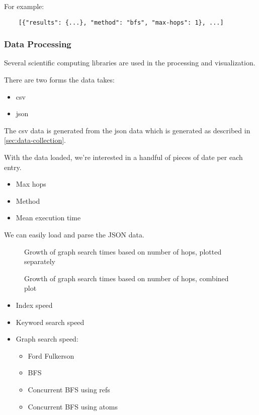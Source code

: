 				For example:
				
				\begin{verbatim}
	[{"results": {...}, "method": "bfs", "max-hops": 1}, ...]
				\end{verbatim}
			
			\subsubsection{Data Processing}
			\label{sec:data-processing}
				Several scientific computing libraries are used in the processing and visualization.
				
				There are two forms the data takes:
				
				\begin{itemize}
					\item \gls{csv}
					\item \gls{json}
				\end{itemize}
				
				The \gls{csv} data is generated from the \gls{json} data which is generated as described in \vref{sec:data-collection}.
				
				With the data loaded, we're interested in a handful of pieces of date per each entry.
				
				\begin{itemize}
					\item Max hops
					\item Method
					\item Mean execution time
				\end{itemize}
				
				We can easily load and parse the JSON data.
				
				\begin{figure}
					\centering
					
					
					\caption{Growth of graph search times based on number of hops, plotted separately}
					\label{fig:methods-subplots}
				\end{figure}
				
				\begin{figure}
					\centering
					
					
					\caption{Growth of graph search times based on number of hops, combined plot}
					\label{fig:methods-compared}
				\end{figure}
		
		\begin{itemize}
			\item Index speed
			\item Keyword search speed
			\item Graph search speed:
				\begin{itemize}
					\item Ford Fulkerson
					\item BFS
					\item Concurrent BFS using refs
					\item Concurrent BFS using atoms
				\end{itemize}
		\end{itemize}
	
